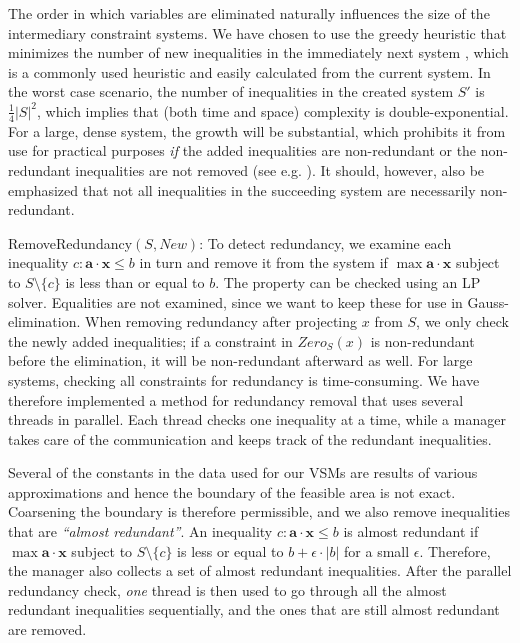 \documentclass{llncs}
\newcommand{\mi}{\mathit}
\newcommand{\ve}{\mathbf}
\begin{document}
The order in which variables are eliminated naturally influences the size of the intermediary constraint systems. We have chosen to use the greedy heuristic {that minimizes the number of new inequalities in the immediately next system \cite{duffin74}}, which is a commonly used heuristic and easily calculated from the current system.
In the worst case scenario, the number of inequalities in the created system $S'$ is $\frac{1}{4}|S|^2$, which implies that (both time and space) complexity is double-exponential. For a large, dense system, the growth will be substantial, which prohibits it from use for practical purposes \emph{if} the added inequalities are non-redundant or the non-redundant inequalities are not removed ({see e.g. \cite{lukatskii08}}). It should, however, also be emphasized that not all inequalities in the succeeding system are necessarily non-redundant. 

{{\sc RemoveRedundancy}$(S,\mathit{New})$:} To detect redundancy, we examine each inequality $c: \ve{a}\cdot \ve{x}\leq b$ in turn and remove it from the system if $\max \ve{a}\cdot \ve{x}$ subject to $S\setminus\{c\}$ is less than or equal to $b$. The property can be checked using an LP solver. Equalities are not examined, since we want to keep these for use in Gauss-elimination. When removing redundancy after projecting $x$ from $S$, we only check the newly added inequalities; if a constraint in $\mi{Zero}_S(x)$ is non-redundant before the elimination, it will be non-redundant afterward as well. 
%
For large systems, checking all constraints for redundancy is time-consuming. We have therefore implemented a method for redundancy removal that uses several threads in parallel. Each thread checks one inequality at a time, while a manager takes care of the communication and keeps track of the redundant inequalities. 

Several of the constants in the data used for our VSMs are results of various approximations and hence the boundary of the feasible area is not exact. Coarsening the boundary is therefore permissible, and we also remove inequalities that are \emph{``almost redundant''}. An inequality $c: \ve{a}\cdot\ve{x}\leq b$ is almost redundant if $\max \ve{a}\cdot\ve{x}$ subject to $S\setminus\{c\}$ is less or equal to $b + \epsilon\cdot |b|$ for a small $\epsilon$. 
Therefore, the manager also collects a set of almost redundant inequalities. After the parallel redundancy check, \emph{one} thread is then used to go through all the almost redundant inequalities sequentially, and the ones that are still almost redundant are removed. 
\end{document}
